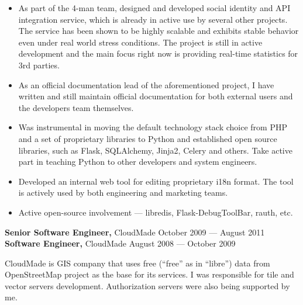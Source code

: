 \documentclass[margin]{res}
\begin{document}
\begin{resume}
\begin{itemize} \itemsep -1pt
\item As part of the 4-man team, designed and developed social identity
  and API integration service, which is already in active use by several
  other projects. The service has been shown to be highly scalable and
  exhibits stable behavior even under real world stress conditions.
  The project is still in active development and the main focus right
  now is providing real-time statistics for 3rd parties.
\item As an official documentation lead of the aforementioned project,
  I have written and still maintain official documentation for both external
  users and the developers team themselves.
\item Was instrumental in moving the default technology stack choice
  from PHP and a set of proprietary libraries to Python and established
  open source libraries, such as Flask, SQLAlchemy, Jinja2, Celery and others.
  Take active part in teaching Python to other developers and system engineers.
\item Developed an internal web tool for editing proprietary i18n format.
  The tool is actively used by both engineering and marketing teams.
\item Active open-source involvement --- libredis, Flask-DebugToolBar, rauth, etc.
\end{itemize}

{\bf Senior Software Engineer,} CloudMade \hfill October 2009 --- August 2011\\
{\bf Software Engineer,} CloudMade \hfill August 2008 --- October 2009

CloudMade is GIS company that uses free (``free'' as in ``libre'')
data from OpenStreetMap project as the base for its services. I was
responsible for tile and vector servers development. Authorization
servers were also being supported by me.\\


\end{resume}
\end{document}
